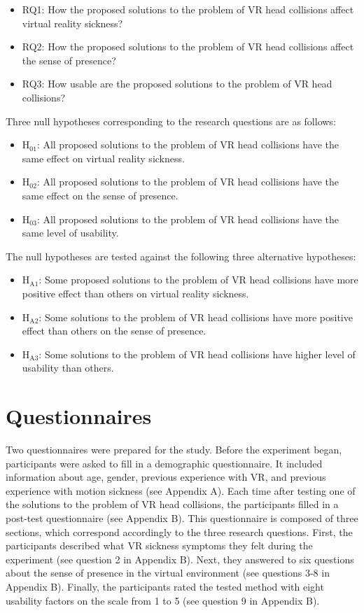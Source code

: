 \begin{itemize}
\item RQ1: How the proposed solutions to the problem of VR head collisions affect virtual reality sickness?
\item RQ2: How the proposed solutions to the problem of VR head collisions affect the sense of presence?
\item RQ3: How usable are the proposed solutions to the problem of VR head collisions?
\end{itemize}

Three null hypotheses corresponding to the research questions are as follows:

\begin{itemize}
\item H$_{\text{01}}$: All proposed solutions to the problem of VR head collisions have the same effect on virtual reality sickness.
\item H$_{\text{02}}$: All proposed solutions to the problem of VR head collisions have the same effect on the sense of presence.
\item H$_{\text{03}}$: All proposed solutions to the problem of VR head collisions have the same level of usability.
\end{itemize}

The null hypotheses are tested against the following three alternative hypotheses:

\begin{itemize}
\item H$_{\text{A1}}$: Some proposed solutions to the problem of VR head collisions have more positive effect than others on virtual reality sickness.
\item H$_{\text{A2}}$: Some solutions to the problem of VR head collisions have more positive effect than others on the sense of presence.
\item H$_{\text{A3}}$: Some solutions to the problem of VR head collisions have higher level of usability than others.
\end{itemize}

\section{Questionnaires}

Two questionnaires were prepared for the study. Before the experiment began, participants were asked to fill in a demographic questionnaire. It included information about age, gender, previous experience with VR, and previous experience with motion sickness (see Appendix A). Each time after testing one of the solutions to the problem of VR head collisions, the participants filled in a post-test questionnaire (see Appendix B). This questionnaire is composed of three sections, which correspond accordingly to the three research questions. First, the participants described what VR sickness symptoms they felt during the experiment (see question 2 in Appendix B). Next, they answered to six questions about the sense of presence in the virtual environment (see questions 3-8 in Appendix B). Finally, the participants rated the tested method with eight usability factors on the scale from 1 to 5 (see question 9 in Appendix B).

